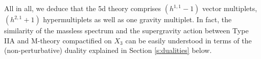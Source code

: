 All in all, we deduce that the 5d theory comprises $(h^{1,1}-1)$ vector multiplets, $(h^{2,1}+1)$ hypermultiplets as well as one gravity multiplet. In fact, the similarity of the massless spectrum and the supergravity action between Type IIA and M-theory compactified on $X_3$ can be easily understood in terms of the (non-perturbative) duality explained in Section \ref{s:dualities} below. 

